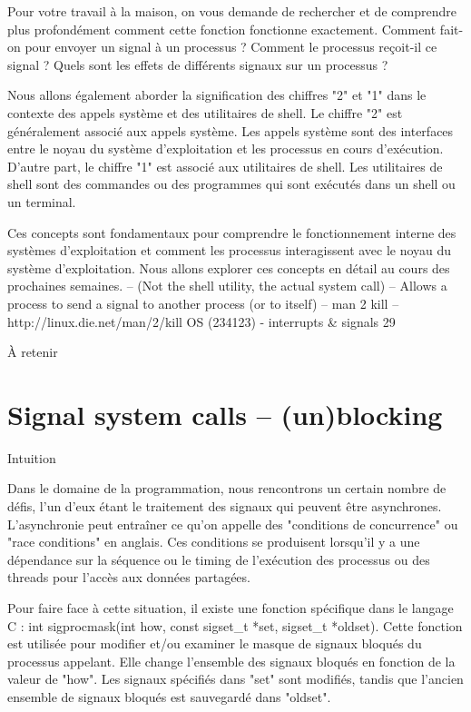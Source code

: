 \documentclass[12pt]{article}
\begin{document}
Pour votre travail à la maison, on vous demande de rechercher et de comprendre plus profondément comment cette fonction fonctionne exactement. Comment fait-on pour envoyer un signal à un processus ? Comment le processus reçoit-il ce signal ? Quels sont les effets de différents signaux sur un processus ?

Nous allons également aborder la signification des chiffres "2" et "1" dans le contexte des appels système et des utilitaires de shell. Le chiffre "2" est généralement associé aux appels système. Les appels système sont des interfaces entre le noyau du système d'exploitation et les processus en cours d'exécution. D'autre part, le chiffre "1" est associé aux utilitaires de shell. Les utilitaires de shell sont des commandes ou des programmes qui sont exécutés dans un shell ou un terminal.

Ces concepts sont fondamentaux pour comprendre le fonctionnement interne des systèmes d'exploitation et comment les processus interagissent avec le noyau du système d'exploitation. Nous allons explorer ces concepts en détail au cours des prochaines semaines.
– (Not the shell utility, the actual system call)
– Allows a process to send a signal to another process (or to itself)
– man 2 kill – http://linux.die.net/man/2/kill
OS (234123) - interrupts \& signals
29
\begin{aretenir}{À retenir}
\end{aretenir}

\section{Signal system calls – (un)blocking}
\begin{myvulga}{Intuition}
\end{myvulga}
Dans le domaine de la programmation, nous rencontrons un certain nombre de défis, l'un d'eux étant le traitement des signaux qui peuvent être asynchrones. L'asynchronie peut entraîner ce qu'on appelle des "conditions de concurrence" ou "race conditions" en anglais. Ces conditions se produisent lorsqu'il y a une dépendance sur la séquence ou le timing de l'exécution des processus ou des threads pour l'accès aux données partagées.

Pour faire face à cette situation, il existe une fonction spécifique dans le langage C : int sigprocmask(int how, const sigset_t *set, sigset_t *oldset). Cette fonction est utilisée pour modifier et/ou examiner le masque de signaux bloqués du processus appelant. Elle change l'ensemble des signaux bloqués en fonction de la valeur de "how". Les signaux spécifiés dans "set" sont modifiés, tandis que l'ancien ensemble de signaux bloqués est sauvegardé dans "oldset".
\end{document}
